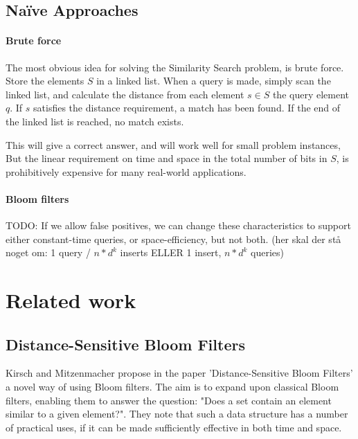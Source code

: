 \documentclass[a4paper,11pt]{article}
\begin{document}
\subsection{Naïve Approaches}

\paragraph{Brute force}
The most obvious idea for solving the Similarity Search problem, is brute force. Store the elements $S$ in a linked list. When a query is made, simply scan the linked list, and calculate the distance from each element $s \in S$ the query element $q$. If $s$ satisfies the distance requirement, a match has been found. If the end of the linked list is reached, no match exists.

This will give a correct answer, and will work well for small problem instances, But the linear requirement on time and space in the total number of bits in $S$, is prohibitively expensive for many real-world applications.

\paragraph{Bloom filters} TODO: If we allow false positives, we can change these characteristics to support either constant-time queries, or space-efficiency, but not both. (her skal der stå noget om: 1 query / $n*d^k$ inserts ELLER 1 insert, $n*d^k$ queries)





\section{Related work} %

\subsection{Distance-Sensitive Bloom Filters}
Kirsch and Mitzenmacher propose in the paper 'Distance-Sensitive Bloom Filters'\cite{paper:harvard} a novel way of using Bloom filters. The aim is to expand upon classical Bloom filters, enabling them to answer the question: "Does a set contain an element similar to a given element?". They note that such a data structure has a number of practical uses, if it can be made sufficiently effective in both time and space.
\end{document}
